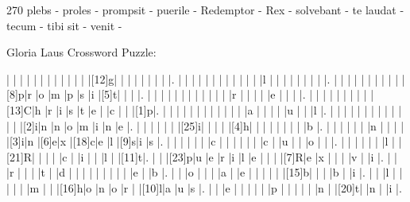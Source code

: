 \documentclass[12pt]{article}
\begin{document}
\pagestyle{fancy}
\fancyhf{}
\renewcommand{\headrulewidth}{0pt}
\renewcommand{\footrulewidth}{0pt}
\libertine
\renewcommand\PuzzleClueFont{\rm\normalsize}
\noindent\begin{rotate}{0}
\small
\end{rotate}
\hfill
\begin{rotate}{270}
\small plebs - proles - prompsit - puerile - Redemptor - Rex - solvebant - te laudat - tecum - tibi sit - venit - 
\end{rotate}
\begin{center}
  \huge{Gloria Laus Crossword Puzzle:}
\end{center}
\vspace{1.5cm}
\begin{Puzzle}{22}{24}
  |{}  |{}  |{}  |{}  |{}  |{}  |{}  |{}  |{}  |{}  |{}  |{}  |[12]g|{}  |{}  |{}  |{}  |{}  |{}  |{}  |{}  |.
  |{}  |{}  |{}  |{}  |{}  |{}  |{}  |{}  |{}  |{}  |{}  |{}  |l   |{}  |{}  |{}  |{}  |{}  |{}  |{}  |{}  |.
  |{}  |{}  |{}  |{}  |{}  |{}  |{}  |{}  |{}  |{}  |[8]p|r   |o   |m   |p   |s   |i   |[5]t|{}  |{}  |{}  |.
  |{}  |{}  |{}  |{}  |{}  |{}  |{}  |{}  |{}  |{}  |{}  |{}  |r   |{}  |{}  |{}  |{}  |e   |{}  |{}  |{}  |.
  |{}  |{}  |{}  |{}  |{}  |{}  |{}  |{}  |{}  |[13]C|h   |r   |i   |s   |t   |e   |{}  |c   |{}  |{}  |[1]p|.
  |{}  |{}  |{}  |{}  |{}  |{}  |{}  |{}  |{}  |{}  |{}  |{}  |a   |{}  |{}  |{}  |{}  |u   |{}  |{}  |l   |.
  |{}  |{}  |{}  |{}  |{}  |{}  |{}  |{}  |{}  |{}  |{}  |{}  |{}  |[2]i|n   |n   |o   |m   |i   |n   |e   |.
  |{}  |{}  |{}  |{}  |{}  |{}  |[25]i|{}  |{}  |{}  |{}  |[4]h|{}  |{}  |{}  |{}  |{}  |{}  |{}  |{}  |b   |.
  |{}  |{}  |{}  |{}  |{}  |{}  |n   |{}  |{}  |{}  |{}  |[3]i|n   |[6]e|x   |[18]c|e   |l   |[9]s|i   |s   |.
  |{}  |{}  |{}  |{}  |{}  |{}  |c   |{}  |{}  |{}  |{}  |{}  |{}  |c   |{}  |u   |{}  |{}  |o   |{}  |{}  |.
  |{}  |{}  |{}  |{}  |{}  |{}  |l   |{}  |[21]R|{}  |{}  |{}  |{}  |c   |{}  |i   |{}  |{}  |l   |{}  |[11]t|.
  |{}  |{}  |[23]p|u   |e   |r   |i   |l   |e   |{}  |{}  |{}  |[7]R|e   |x   |{}  |{}  |{}  |v   |{}  |i   |.
  |{}  |{}  |r   |{}  |{}  |{}  |t   |{}  |d   |{}  |{}  |{}  |{}  |{}  |{}  |{}  |{}  |{}  |e   |{}  |b   |.
  |{}  |{}  |o   |{}  |{}  |{}  |a   |{}  |e   |{}  |{}  |{}  |{}  |{}  |[15]b|{}  |{}  |{}  |b   |{}  |i   |.
  |{}  |{}  |l   |{}  |{}  |{}  |{}  |{}  |m   |{}  |{}  |[16]h|o   |n   |o   |r   |{}  |[10]l|a   |u   |s   |.
  |{}  |{}  |e   |{}  |{}  |{}  |{}  |{}  |p   |{}  |{}  |{}  |{}  |{}  |n   |{}  |[20]t|{}  |n   |{}  |i   |.

\end{Puzzle}
\end{document}
